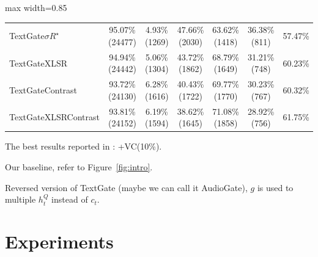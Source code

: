 \documentclass[a4paper]{article}
\begin{document}
\begin{table}
\begin{adjustbox}{max width=0.85\textwidth}
\begin{threeparttable}
\begin{tabular}{lcccccc}
    \rowcolor{gray!20}
    TextGate$\sigma R^{\star}$ & 
    95.07\% (24477) & 
    4.93\% (1269) &  
    47.66\% (2030) &  
    63.62\% (1418) &  
    36.38\% (811) &
    57.47\% %
    \\
    TextGateXLSR & 
    94.94\% (24442) & 
    5.06\% (1304) &  
    43.72\% (1862) &  
    68.79\% (1649) &  
    31.21\% (748) &
    60.23\% %
    \\
    \hline
    TextGateContrast & 
    93.72\% (24130) & 
    6.28\% (1616) &  
    40.43\% (1722) &  
    69.77\% (1770) &  
    30.23\% (767) &
    60.32\% %
    \\
    \rowcolor{gray!20}
    TextGateXLSRContrast & 
    93.81\% (24152) & 
    6.19\% (1594) &  
    38.62\% (1645) &  
    71.08\% (1858) &  
    28.92\% (756) &
    61.75\% %
    \\
    
\bottomrule
\end{tabular}
\begin{tablenotes}
\item[$\dagger$]  The best results reported in \cite{fu2021full}: +VC(10\%).
\item[$\ddagger$] Our baseline, refer to Figure~\ref{fig:intro}.
\item[$\star$] Reversed version of TextGate (maybe we can call it AudioGate), $g$ is used to multiple $h_t^Q$ instead of $c_t$.
\end{tablenotes}
\label{tab:f1}
\end{threeparttable}
\end{adjustbox}
\end{table}


\section{Experiments}
\end{document}
